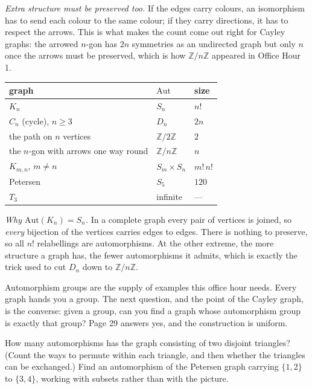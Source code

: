 \documentclass[10pt]{article}
\newcommand{\Z}{\mathbb{Z}}
\begin{document}
{\begin{minipage}[t]{744pt}
\begin{minipage}[t]{368pt}
\begin{pitfall}
\end{pitfall}
\begin{why}
\emph{Extra structure must be preserved too.} If the edges carry colours, an isomorphism has to send each colour to the same colour; if they carry directions, it has to respect the arrows. This is what makes the count come out right for Cayley graphs: the arrowed $n$-gon has $2n$ symmetries as an undirected graph but only $n$ once the arrows must be preserved, which is how $\Z/n\Z$ appeared in Office Hour 1.
\end{why}
\end{minipage}\hfill
\begin{minipage}[t]{360pt}\vspace{0pt}
\centering
\begin{tabular}{@{}lll@{}}
\toprule
graph & $\mathrm{Aut}$ & size\\
\midrule
$K_n$ & $S_n$ & $n!$\\
$C_n$ (cycle), $n\ge3$ & $D_n$ & $2n$\\
the path on $n$ vertices & $\Z/2\Z$ & $2$\\
the $n$-gon with arrows one way round & $\Z/n\Z$ & $n$\\
$K_{m,n}$, $m\neq n$ & $S_m\times S_n$ & $m!\,n!$\\
Petersen & $S_5$ & $120$\\
$T_3$ & infinite & ---\\
\bottomrule
\end{tabular}\par\vspace{4pt}
\raggedright
\begin{why}
\emph{Why $\mathrm{Aut}(K_n)=S_n$.} In a complete graph every pair of vertices is joined, so \emph{every} bijection of the vertices carries edges to edges. There is nothing to preserve, so all $n!$ relabellings are automorphisms. At the other extreme, the more structure a graph has, the fewer automorphisms it admits, which is exactly the trick used to cut $D_n$ down to $\Z/n\Z$.
\end{why}
\begin{bigpic}
Automorphism groups are the supply of examples this office hour needs. Every graph hands you a group. The next question, and the point of the Cayley graph, is the converse: given a group, can you find a graph whose automorphism group is exactly that group? Page 29 answers yes, and the construction is uniform.
\end{bigpic}
\begin{tryit}
How many automorphisms has the graph consisting of two disjoint triangles? (Count the ways to permute within each triangle, and then whether the triangles can be exchanged.) Find an automorphism of the Petersen graph carrying $\{1,2\}$ to $\{3,4\}$, working with subsets rather than with the picture.
\end{tryit}
\end{minipage}
\end{minipage}
}
\end{document}
